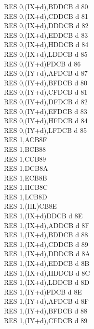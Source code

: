 \begin{multicols}{3}
{\begin{tabbing}
        RES 0,(IX+d),B\UNDOC\>DDCB d 80\\
        RES 0,(IX+d),C\UNDOC\>DDCB d 81\\
        RES 0,(IX+d),D\UNDOC\>DDCB d 82\\
        RES 0,(IX+d),E\UNDOC\>DDCB d 83\\
        RES 0,(IX+d),H\UNDOC\>DDCB d 84\\
        RES 0,(IX+d),L\UNDOC\>DDCB d 85\\
        RES 0,(IY+d)\>FDCB d 86\\
        RES 0,(IY+d),A\UNDOC\>FDCB d 87\\
        RES 0,(IY+d),B\UNDOC\>FDCB d 80\\
        RES 0,(IY+d),C\UNDOC\>FDCB d 81\\
        RES 0,(IY+d),D\UNDOC\>FDCB d 82\\
        RES 0,(IY+d),E\UNDOC\>FDCB d 83\\
        RES 0,(IY+d),H\UNDOC\>FDCB d 84\\
        RES 0,(IY+d),L\UNDOC\>FDCB d 85\\
        RES 1,A\>CB8F\\
        RES 1,B\>CB88\\
        RES 1,C\>CB89\\
        RES 1,D\>CB8A\\
        RES 1,E\>CB8B\\
        RES 1,H\>CB8C\\
        RES 1,L\>CB8D\\
        RES 1,(HL)\>CB8E\\
        RES 1,(IX+d)\>DDCB d 8E\\
        RES 1,(IX+d),A\UNDOC\>DDCB d 8F\\
        RES 1,(IX+d),B\UNDOC\>DDCB d 88\\
        RES 1,(IX+d),C\UNDOC\>DDCB d 89\\
        RES 1,(IX+d),D\UNDOC\>DDCB d 8A\\
        RES 1,(IX+d),E\UNDOC\>DDCB d 8B\\
        RES 1,(IX+d),H\UNDOC\>DDCB d 8C\\
        RES 1,(IX+d),L\UNDOC\>DDCB d 8D\\
        RES 1,(IY+d)\>FDCB d 8E\\
        RES 1,(IY+d),A\UNDOC\>FDCB d 8F\\
        RES 1,(IY+d),B\UNDOC\>FDCB d 88\\
        RES 1,(IY+d),C\UNDOC\>FDCB d 89\\

\end{tabbing}}
\end{multicols}
